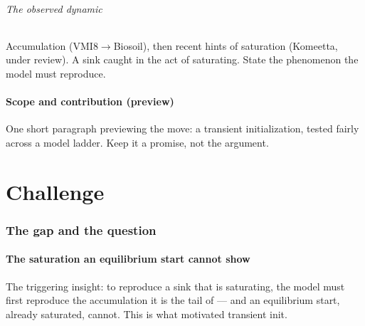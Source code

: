 \documentclass[11pt]{article}
\begin{document}
\paragraph{The observed dynamic}
Accumulation (VMI8$\to$Biosoil), then recent hints of saturation (Komeetta,
under review). A sink caught in the act of saturating. State the phenomenon
the model must reproduce.

\subsection{Scope and contribution (preview)}
One short paragraph previewing the move: a transient initialization, tested
fairly across a model ladder. Keep it a promise, not the argument.

\part{Challenge}

\section{The gap and the question}

\subsection{The saturation an equilibrium start cannot show}
The triggering insight: to reproduce a sink that is saturating, the model must
first reproduce the accumulation it is the tail of --- and an equilibrium
start, already saturated, cannot. This is what motivated transient init.
\end{document}
